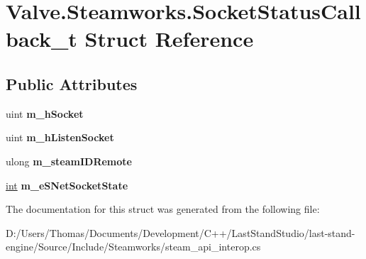 \hypertarget{structValve_1_1Steamworks_1_1SocketStatusCallback__t}{}\section{Valve.\+Steamworks.\+Socket\+Status\+Callback\+\_\+t Struct Reference}
\label{structValve_1_1Steamworks_1_1SocketStatusCallback__t}
\subsection*{Public Attributes}
\begin{DoxyCompactItemize}
\item 
\hypertarget{structValve_1_1Steamworks_1_1SocketStatusCallback__t_a1a533a07b392f73dfe8f30f079d52f16}{}uint {\bfseries m\+\_\+h\+Socket}\label{structValve_1_1Steamworks_1_1SocketStatusCallback__t_a1a533a07b392f73dfe8f30f079d52f16}

\item 
\hypertarget{structValve_1_1Steamworks_1_1SocketStatusCallback__t_a4b9afa708cc7c383b525db6d291c1a03}{}uint {\bfseries m\+\_\+h\+Listen\+Socket}\label{structValve_1_1Steamworks_1_1SocketStatusCallback__t_a4b9afa708cc7c383b525db6d291c1a03}

\item 
\hypertarget{structValve_1_1Steamworks_1_1SocketStatusCallback__t_a4459d89fdbb738b7ba712f0139f4fb19}{}ulong {\bfseries m\+\_\+steam\+I\+D\+Remote}\label{structValve_1_1Steamworks_1_1SocketStatusCallback__t_a4459d89fdbb738b7ba712f0139f4fb19}

\item 
\hypertarget{structValve_1_1Steamworks_1_1SocketStatusCallback__t_a12ce0a70896f2b367e52ce44f259cd8a}{}\hyperlink{SDL__thread_8h_a6a64f9be4433e4de6e2f2f548cf3c08e}{int} {\bfseries m\+\_\+e\+S\+Net\+Socket\+State}\label{structValve_1_1Steamworks_1_1SocketStatusCallback__t_a12ce0a70896f2b367e52ce44f259cd8a}

\end{DoxyCompactItemize}


The documentation for this struct was generated from the following file\+:\begin{DoxyCompactItemize}
\item 
D\+:/\+Users/\+Thomas/\+Documents/\+Development/\+C++/\+Last\+Stand\+Studio/last-\/stand-\/engine/\+Source/\+Include/\+Steamworks/steam\+\_\+api\+\_\+interop.\+cs\end{DoxyCompactItemize}
